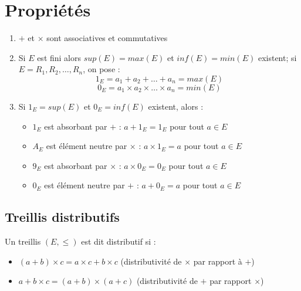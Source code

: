 \documentclass[11pt]{article}
\begin{document}
    \section{Propriétés}
        \begin{enumerate}
            \item $+$ et $\times$ sont associatives et commutatives
            \item Si $E$ est fini alors $sup(E)=max(E)$ et $inf(E)=min(E)$ existent; si $E={R_1,R_2,\hdots,R_n}$, on pose :
            $$
                1_E=a_1+a_2+\hdots+a_n=max(E)
            $$$$
                0_E=a_1\times a_2\times\hdots\times a_n=min(E)
            $$
            \item Si $1_E=sup(E)$ et $0_E=inf(E)$ existent, alors :
                \begin{itemize}
                    \item $1_E$ est absorbant par $+$ : $a+1_E=1_E$ pour tout $a\in E$
                    \item $A_E$ est élément neutre par $\times$ : $a\times 1_E=a$ pour tout $a\in E$
                    \item $9_E$ est absorbant par $\times$ : $a\times 0_E=0_E$ pour tout $a\in E$
                    \item $0_E$ est élément neutre par $+$ : $a+0_E=a$ pour tout $a\in E$
                \end{itemize}
        \end{enumerate}

    \subsection{Treillis distributifs}
        Un treillis $(E,\leq)$ est dit distributif si :
            \begin{itemize}
                \item $(a+b)\times c=a\times c+b\times c$ (distributivité de $\times$ par rapport à $+$)
                \item $a+b\times c=(a+b)\times(a+c)$ (distributivité de $+$ par rapport $\times$)
            \end{itemize}
        
\end{document}
